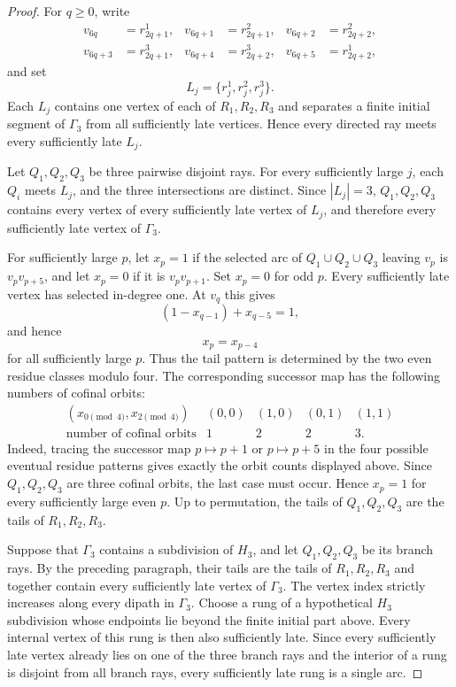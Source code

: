 \documentclass[10pt,a4paper]{amsart}
\begin{document}
\begin{proof}
For $q\ge0$, write
\[
\begin{aligned}
v_{6q}&=r^1_{2q+1}, & v_{6q+1}&=r^2_{2q+1}, & v_{6q+2}&=r^2_{2q+2},\\
v_{6q+3}&=r^3_{2q+1}, & v_{6q+4}&=r^3_{2q+2}, & v_{6q+5}&=r^1_{2q+2},
\end{aligned}
\]
and set
\[
L_j=\{r^1_j,r^2_j,r^3_j\}.
\]
Each $L_j$ contains one vertex of each of $R_1,R_2,R_3$ and separates a finite initial segment of $\Gamma_3$
from all sufficiently late vertices. Hence every directed ray meets every sufficiently late $L_j$.

Let $Q_1,Q_2,Q_3$ be three pairwise disjoint rays. For every sufficiently large $j$, each $Q_i$ meets $L_j$, and the three intersections are distinct. Since $|L_j|=3$, $Q_1,Q_2,Q_3$ contains every vertex of every sufficiently late vertex of $L_j$, and therefore every sufficiently late vertex of $\Gamma_3$.

For sufficiently large $p$, let $x_p=1$ if the selected arc of $Q_1\cup Q_2\cup Q_3$ leaving $v_p$ is $v_pv_{p+5}$,
and let $x_p=0$ if it is $v_pv_{p+1}$. Set $x_p=0$ for odd $p$. Every sufficiently late vertex has selected in-degree one. At $v_q$ this gives
\[
(1-x_{q-1})+x_{q-5}=1,
\]
and hence
\begin{equation}
x_p=x_{p-4}
\end{equation}
for all sufficiently large $p$. Thus the tail pattern is determined by the two even residue classes modulo four. The corresponding successor map has the following numbers of cofinal orbits:
\[
\begin{array}{c|cccc}
(x_{0\pmod4},x_{2\pmod4})&(0,0)&(1,0)&(0,1)&(1,1)\\\hline
\text{number of cofinal orbits}&1&2&2&3.
\end{array}
\]
Indeed, tracing the successor map $p\mapsto p+1$ or $p\mapsto p+5$ in the four possible eventual residue patterns gives exactly the orbit counts displayed above. Since $Q_1,Q_2,Q_3$ are three cofinal orbits, the last case must occur. Hence $x_p=1$ for every sufficiently large even $p$. Up to permutation, the tails of $Q_1,Q_2,Q_3$ are the tails of $R_1,R_2,R_3$.

Suppose that $\Gamma_3$ contains a subdivision of $H_3$, and let $Q_1,Q_2,Q_3$ be its branch rays. By the preceding paragraph, their tails are the tails of $R_1,R_2,R_3$ and together contain every sufficiently late vertex of $\Gamma_3$. The vertex index strictly increases along every dipath in $\Gamma_3$. Choose a rung of a hypothetical $H_3$ subdivision whose endpoints lie beyond the finite initial part above. Every internal vertex of this rung is then also sufficiently late. Since every sufficiently late vertex already lies on one of the three branch rays and the interior of a rung is disjoint from all branch rays, every sufficiently late rung is a single arc.


\end{proof}
\end{document}
